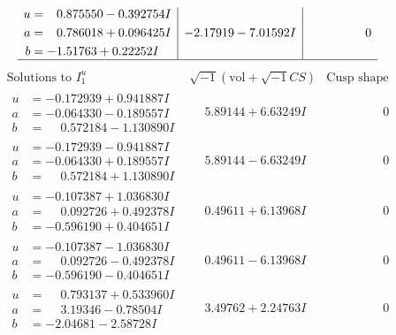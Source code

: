 \documentclass[1p]{elsarticle_modified}
\theoremstyle{definition}
\newcommand{\I}{\sqrt{-1}}
\begin{document}
$$\begin{array}{c|c|c}
\begin{aligned}
u &= \phantom{-}0.875550 - 0.392754 I \\
a &= \phantom{-}0.786018 + 0.096425 I \\
b &= -1.51763 + 0.22252 I\end{aligned}
 & -2.17919 - 7.01592 I & \phantom{-0.000000 } 0\\
 \hline 
 \end{array}$$\newpage$$\begin{array}{c|c|c}  
\text{Solutions to }I^u_{1}& \I (\text{vol} + \sqrt{-1}CS) & \text{Cusp shape}\\
 \hline 
\begin{aligned}
u &= -0.172939 + 0.941887 I \\
a &= -0.064330 - 0.189557 I \\
b &= \phantom{-}0.572184 - 1.130890 I\end{aligned}
 & \phantom{-}5.89144 + 6.63249 I & \phantom{-0.000000 } 0 \\ \hline\begin{aligned}
u &= -0.172939 - 0.941887 I \\
a &= -0.064330 + 0.189557 I \\
b &= \phantom{-}0.572184 + 1.130890 I\end{aligned}
 & \phantom{-}5.89144 - 6.63249 I & \phantom{-0.000000 } 0 \\ \hline\begin{aligned}
u &= -0.107387 + 1.036830 I \\
a &= \phantom{-}0.092726 + 0.492378 I \\
b &= -0.596190 + 0.404651 I\end{aligned}
 & \phantom{-}0.49611 + 6.13968 I & \phantom{-0.000000 } 0 \\ \hline\begin{aligned}
u &= -0.107387 - 1.036830 I \\
a &= \phantom{-}0.092726 - 0.492378 I \\
b &= -0.596190 - 0.404651 I\end{aligned}
 & \phantom{-}0.49611 - 6.13968 I & \phantom{-0.000000 } 0 \\ \hline\begin{aligned}
u &= \phantom{-}0.793137 + 0.533960 I \\
a &= \phantom{-}3.19346 - 0.78504 I \\
b &= -2.04681 - 2.58728 I\end{aligned}
 & \phantom{-}3.49762 + 2.24763 I & \phantom{-0.000000 } 0 \\ \hline\begin{aligned}

\end{aligned}
\end{array}$$
\end{document}
